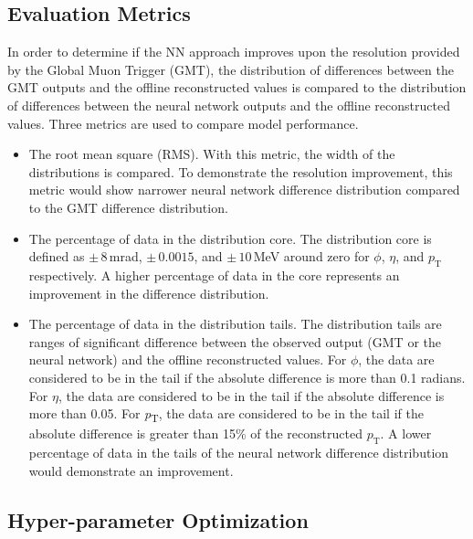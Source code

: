 \documentclass[10pt, paper=a4, UKenglish]{article}
\begin{document}
\subsection{Evaluation Metrics}


In order to determine if the NN approach improves upon the resolution provided by the Global Muon Trigger (GMT), the distribution of differences between the GMT outputs and the offline reconstructed values is compared to the distribution of differences between the neural network outputs and the offline reconstructed values. Three metrics are used to compare model performance. 

\begin{itemize}
\item The root mean square (RMS). With this metric, the width of the distributions is compared. To demonstrate the resolution improvement, this metric would show narrower neural network difference distribution compared to the GMT difference distribution.

\item The percentage of data in the distribution core. The distribution core is defined as $\pm\,8$\,mrad, $\pm\,0.0015$, and $\pm\,10$\,MeV around zero for $\phi$, $\eta$, and $p_\mathrm{T}$ respectively. A higher percentage of data in the core represents an improvement in the difference distribution.

\item The percentage of data in the distribution tails. The distribution tails are ranges of significant difference between the observed output (GMT or the neural network) and the offline reconstructed values. For $\phi$, the data are considered to be in the tail if the absolute difference is more than 0.1 radians. For $\eta$, the data are considered to be in the tail if the absolute difference is more than 0.05. For \textit{p}\textsubscript{T}, the data are considered to be in the tail if the absolute difference is greater than 15\% of the reconstructed $p_\mathrm{T}$. A lower percentage of data in the tails of the neural network difference distribution would demonstrate an improvement.

\end{itemize}

\subsection{Hyper-parameter Optimization}
\end{document}
